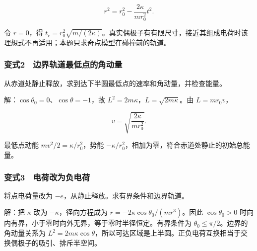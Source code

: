 \documentclass[12pt,a4paper,fontset=fandol]{ctexart}
\begin{document}
\[r^2=r_0^2-\frac{2\kappa}{mr_0^2}t^2.\]

令 \(r=0\)，得
\(t_c=r_0^2\sqrt{m/(2\kappa)}\)。真实偶极子有有限尺寸，接近其组成电荷时该理想式不再适用；本题只求奇点模型在碰撞前的轨道。

\subsubsection{变式2　边界轨道最低点的角动量}\label{ux53d8ux5f0f2-ux8fb9ux754cux8f68ux9053ux6700ux4f4eux70b9ux7684ux89d2ux52a8ux91cf}

从赤道处静止释放，求到达下半圆最低点的速率和角动量，并检查能量。

解：\(\cos\theta_0=0\)、\(\cos\theta=-1\)，故
\(L^2=2m\kappa\)，\(L=\sqrt{2m\kappa}\)。由 \(L=mr_0v\)，

\[v=\sqrt{\frac{2\kappa}{mr_0^2}}.\]

最低点动能 \(mv^2/2=\kappa/r_0^2\)，势能
\(-\kappa/r_0^2\)，相加为零，符合赤道处静止的初始总能量。

\subsubsection{变式3　电荷改为负电荷}\label{ux53d8ux5f0f3-ux7535ux8377ux6539ux4e3aux8d1fux7535ux8377}

将点电荷量改为 \(-e\)，从静止释放。求有界条件和边界轨道。

解：把 \(\kappa\) 改为 \(-\kappa\)，径向方程成为
\(\ddot r=-2\kappa\cos\theta_0/(mr^3)\)。因此 \(\cos\theta_0>0\)
时向内有界，小于零时向外无界，等于零时半径恒定。有界条件为
\(\theta_0\le\pi/2\)。边界的角动量关系为
\(L^2=2m\kappa\cos\theta\)，所以可达区域是上半圆。正负电荷互换相当于交换偶极子的吸引、排斥半空间。
\end{document}
